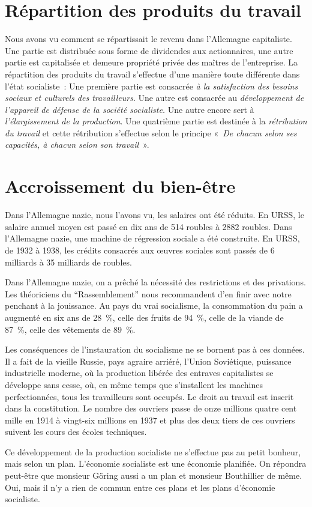 \documentclass[french,twoside]{book} %
\begin{document}
\section[Répartition des produits du travail]{Répartition des produits du travail}
\noindent Nous avons vu comment se répartissait le revenu dans l’Allemagne capitaliste. Une partie est distribuée sous forme de dividendes aux actionnaires, une autre partie est capitalisée et demeure propriété privée des maîtres de l’entreprise. La répartition des produits du travail s’effectue d’une manière toute différente dans l’état socialiste : Une première partie est consacrée \emph{à la satisfaction des besoins sociaux et culturels des travailleurs}. Une autre est consacrée au \emph{développement de l’appareil de défense de la société socialiste.} Une autre encore sert à \emph{l’élargissement de la production}. Une quatrième partie est destinée à la \emph{rétribution du travail} et cette rétribution s’effectue selon le principe « \emph{De chacun selon ses capacités, à chacun selon son travail} ».
\section[Accroissement du bien-être]{Accroissement du bien-être}
\noindent Dans l’Allemagne nazie, nous l’avons vu, les salaires ont été réduits. En URSS, le salaire annuel moyen est passé en dix ans de 514 roubles à 2882 roubles. Dans l’Allemagne nazie, une machine de régression sociale a été construite. En URSS, de 1932 à 1938, les crédits consacrés aux œuvres sociales sont passés de 6 milliards à 35 milliards de roubles.\par
Dans l’Allemagne nazie, on a prêché la nécessité des restrictions et des privations. Les théoriciens du “Rassemblement” nous recommandent d’en finir avec notre penchant à la jouissance. Au pays du vrai socialisme, la consommation du pain a augmenté en six ans de 28 \%, celle des fruits de 94 \%, celle de la viande de 87 \%, celle des vêtements de 89 \%.\par
Les conséquences de l’instauration du socialisme ne se bornent pas à ces données. Il a fait de la vieille Russie, pays agraire arriéré, l’Union Soviétique, puissance industrielle moderne, où la production libérée des entraves capitalistes se développe sans cesse, où, en même temps que s’installent les machines perfectionnées, tous les travailleurs sont occupés. Le droit au travail est inscrit dans la constitution. Le nombre des ouvriers passe de onze millions quatre cent mille en 1914 à vingt-six millions en 1937 et plus des deux tiers de ces ouvriers suivent les cours des écoles techniques.\par
Ce développement de la production socialiste ne s’effectue pas au petit bonheur, mais selon un plan. L’économie socialiste est une économie planifiée. On répondra peut-être que monsieur Göring aussi a un plan et monsieur Bouthillier de même. Oui, mais il n’y a rien de commun entre ces plans et les plans d’économie socialiste.
\end{document}
